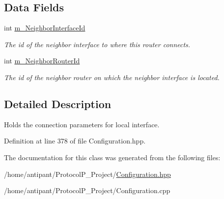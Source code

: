\subsection*{Data Fields}
\begin{DoxyCompactItemize}
\item 
\hypertarget{classConnection_aa025764cb3ec8317eebf40b4c92f0551}{int \hyperlink{classConnection_aa025764cb3ec8317eebf40b4c92f0551}{m\-\_\-\-Neighbor\-Interface\-Id}}\label{classConnection_aa025764cb3ec8317eebf40b4c92f0551}

\begin{DoxyCompactList}\small\item\em The id of the neighbor interface to where this router connects. \end{DoxyCompactList}\item 
\hypertarget{classConnection_a0c3cc5f16fa26d798d63472a309185cb}{int \hyperlink{classConnection_a0c3cc5f16fa26d798d63472a309185cb}{m\-\_\-\-Neighbor\-Router\-Id}}\label{classConnection_a0c3cc5f16fa26d798d63472a309185cb}

\begin{DoxyCompactList}\small\item\em The id of the neighbor router on which the neighbor interface is located. \end{DoxyCompactList}\end{DoxyCompactItemize}


\subsection{Detailed Description}
Holds the connection parameters for local interface. 

Definition at line 378 of file Configuration.\-hpp.



The documentation for this class was generated from the following files\-:\begin{DoxyCompactItemize}
\item 
/home/antipant/\-Protocol\-P\-\_\-\-Project/\hyperlink{Configuration_8hpp}{Configuration.\-hpp}\item 
/home/antipant/\-Protocol\-P\-\_\-\-Project/Configuration.\-cpp\end{DoxyCompactItemize}
